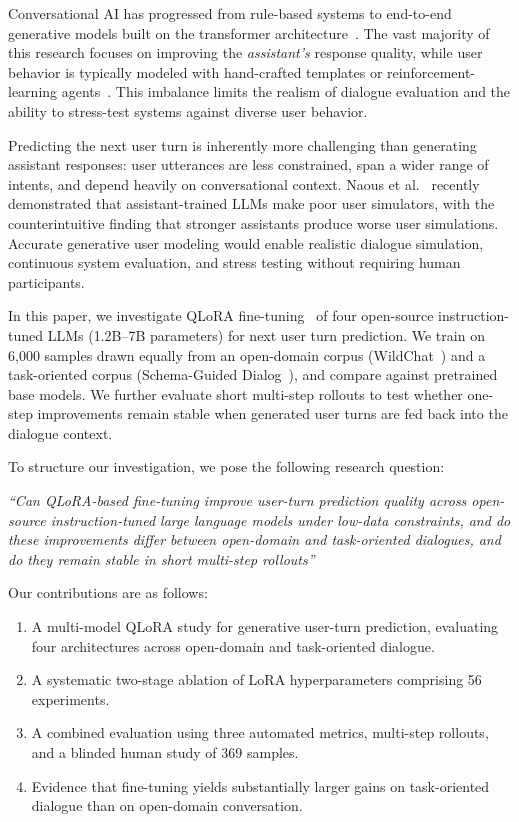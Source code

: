 \documentclass[conference]{IEEEtran}
\begin{document}
Conversational AI has progressed from rule-based systems to end-to-end generative models built on the transformer architecture~\cite{vaswani2017attention, serban2016hierarchical}. The vast majority of this research focuses on improving the \emph{assistant's} response quality, while user behavior is typically modeled with hand-crafted templates or reinforcement-learning agents~\cite{shi2019simulators}. This imbalance limits the realism of dialogue evaluation and the ability to stress-test systems against diverse user behavior.

Predicting the next user turn is inherently more challenging than generating assistant responses: user utterances are less constrained, span a wider range of intents, and depend heavily on conversational context. Naous et al.~\cite{naous2025flipping} recently demonstrated that assistant-trained LLMs make poor user simulators, with the counterintuitive finding that stronger assistants produce worse user simulations. Accurate generative user modeling would enable realistic dialogue simulation, continuous system evaluation, and stress testing without requiring human participants.

In this paper, we investigate QLoRA fine-tuning~\cite{dettmers2023qlora} of four open-source instruction-tuned LLMs (1.2B--7B parameters) for next user turn prediction. We train on 6{,}000 samples drawn equally from an open-domain corpus (WildChat~\cite{zhao2024wildchat}) and a task-oriented corpus (Schema-Guided Dialog~\cite{rastogi2020sgd}), and compare against pretrained base models. We further evaluate short multi-step rollouts to test whether one-step improvements remain stable when generated user turns are fed back into the dialogue context.

To structure our investigation, we pose the following research question:

\textit{``Can QLoRA-based fine-tuning improve user-turn prediction quality across open-source instruction-tuned large language models under low-data constraints, and do these improvements differ between open-domain and task-oriented dialogues, and do they remain stable in short multi-step rollouts''}

Our contributions are as follows:
\begin{enumerate}
    \item A multi-model QLoRA study for generative user-turn prediction, evaluating four architectures across open-domain and task-oriented dialogue.
    \item A systematic two-stage ablation of LoRA hyperparameters comprising 56 experiments.
    \item A combined evaluation using three automated metrics, multi-step rollouts, and a blinded human study of 369 samples.
    \item Evidence that fine-tuning yields substantially larger gains on task-oriented dialogue than on open-domain conversation.
\end{enumerate}
\end{document}
